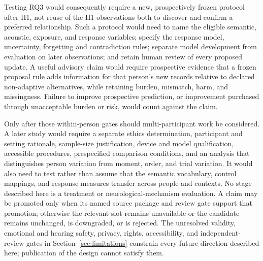 Testing RQ3 would consequently require a new, prospectively frozen protocol
after H1, not reuse of the H1 observations both to discover and confirm a
preferred relationship. Such a protocol would need to name the eligible semantic,
acoustic, exposure, and response variables; specify the response model,
uncertainty, forgetting and contradiction rules; separate model development
from evaluation on later observations; and retain human review of every
proposed update. A useful advisory claim would require prospective evidence
that a frozen proposal rule adds information for that person's new records
relative to declared non-adaptive alternatives, while retaining burden,
mismatch, harm, and missingness. Failure to improve prospective prediction, or
improvement purchased through unacceptable burden or risk, would count against
the claim.

Only after those within-person gates should multi-participant work be
considered. A later study would require a separate ethics
determination, participant and setting rationale, sample-size justification,
device and model qualification, accessible procedures, prespecified comparison
conditions, and an analysis that distinguishes person variation from moment,
order, and trial variation. It would also need to test rather than assume that
the semantic vocabulary, control mappings, and response measures transfer
across people and contexts. No stage described here is a treatment or
neurological-mechanism evaluation. A claim may be promoted only when its named
source package and review gate support that promotion; otherwise the relevant
slot remains unavailable or the candidate remains unchanged, is downgraded, or
is rejected. The unresolved validity, emotional and hearing safety, privacy,
rights, accessibility, and independent-review gates in
Section~\ref{sec:limitations} constrain every future direction described here;
publication of the design cannot satisfy them.
